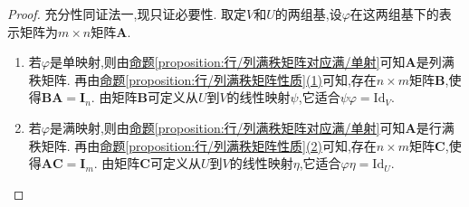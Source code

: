 \documentclass[../../main.tex]{subfiles}%
\begin{document}
\begin{proof}
充分性同{\color{blue}证法一},现只证必要性. 取定\(V\)和\(U\)的两组基,设\(\varphi\)在这两组基下的表示矩阵为\(m\times n\)矩阵\(\boldsymbol{A}\).
\begin{enumerate}[(1)]
\item 若\(\varphi\)是单映射,则由\hyperref[proposition:行/列满秩矩阵对应满/单射]{命题\ref{proposition:行/列满秩矩阵对应满/单射}}可知\(\boldsymbol{A}\)是列满秩矩阵. 再由\hyperref[proposition:行/列满秩矩阵性质]{命题\ref{proposition:行/列满秩矩阵性质}(1)}可知,存在\(n\times m\)矩阵\(\boldsymbol{B}\),使得\(\boldsymbol{B}\boldsymbol{A}=\boldsymbol{I}_n\). 由矩阵\(\boldsymbol{B}\)可定义从\(U\)到\(V\)的线性映射\(\psi\),它适合\(\psi\varphi=\text{Id}_V\).

\item 若\(\varphi\)是满映射,则由\hyperref[proposition:行/列满秩矩阵对应满/单射]{命题\ref{proposition:行/列满秩矩阵对应满/单射}}可知\(\boldsymbol{A}\)是行满秩矩阵. 再由\hyperref[proposition:行/列满秩矩阵性质]{命题\ref{proposition:行/列满秩矩阵性质}(2)}可知,存在\(n\times m\)矩阵\(\boldsymbol{C}\),使得\(\boldsymbol{A}\boldsymbol{C}=\boldsymbol{I}_m\). 由矩阵\(\boldsymbol{C}\)可定义从\(U\)到\(V\)的线性映射\(\eta\),它适合\(\varphi\eta=\text{Id}_U\).
\end{enumerate}
\end{proof}
\end{document}
